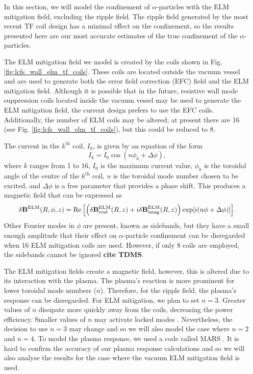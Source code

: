 \documentclass[10pt, a4paper, twoside]{article}
\begin{document}
In this section, we will model the confinement of $\alpha$-particles with the ELM mitigation field, excluding the ripple field. The ripple field generated by the most recent TF coil design has a minimal effect on the confinement, so the results presented here are our most accurate estimates of the true confinement of the $\alpha$-particles.

The ELM mitigation field we model is created by the coils shown in Fig. \ref{fig:lcfs_wall_elm_tf_coils}. These coils are located outside the vacuum vessel and are used to generate both the error field correction (EFC) field and the ELM mitigation field. Although it is possible that in the future, resistive wall mode suppression coils located inside the vacuum vessel may be used to generate the ELM mitigation field, the current design prefers to use the EFC coils. Additionally, the number of ELM coils may be altered; at present there are 16 (see Fig. \ref{fig:lcfs_wall_elm_tf_coils}), but this could be reduced to 8.

The current in the $k^\text{th}$ coil, $I_k$, is given by an equation of the form
\begin{equation}
    \label{eq:ELM_coilcurrent_profile}
    I_k = I_0 \cos(n \phi_k + \Delta \phi),
\end{equation}
where $k$ ranges from 1 to 16, $I_0$ is the maximum current value, $\phi_k$ is the toroidal angle of the centre of the $k^\text{th}$ coil, $n$ is the toroidal mode number chosen to be excited, and $\Delta \phi$ is a free parameter that provides a phase shift. This produces a magnetic field that can be expressed as
\begin{equation}
    \delta\textbf{B}^\text{ELM}(R, \phi, z)=\Re\qty[\qty(\delta\textbf{B}^\text{ELM}_\text{real}(R,z) + i\delta\textbf{B}^\text{ELM}_\text{imag}(R,z))\exp[i(n\phi + \Delta \phi)]].
\end{equation}
Other Fourier modes in $\phi$ are present, known as sidebands, but they have a small enough amplitude that their effect on $\alpha$-particle confinement can be disregarded when 16 ELM mitigation coils are used. However, if only 8 coils are employed, the sidebands cannot be ignored \textbf{cite TDMS}.

The ELM mitigation fields create a magnetic field, however, this is altered due to its interaction with the plasma. The plasma's reaction is more prominent for lower toroidal mode numbers ($n$). Therefore, for the ripple field, the plasma's response can be disregarded. For ELM mitigation, we plan to set $n=3$. Greater values of $n$ dissipate more quickly away from the coils, decreasing the power efficiency. Smaller values of $n$ may activate locked modes \cite{ryan2022}. Nevertheless, the decision to use $n=3$ may change and so we will also model the case where $n=2$ and $n=4$. To model the plasma response, we used a code called MARS \cite{liu2015}. It is hard to confirm the accuracy of our plasma response calculations and so we will also analyse the results for the case where the vacuum ELM mitigation field is used.
\end{document}

